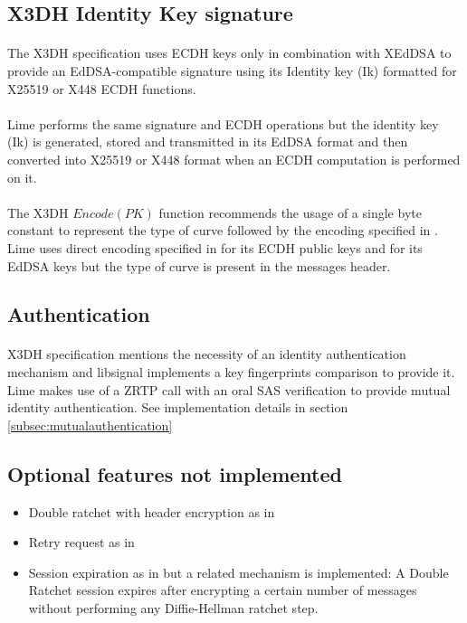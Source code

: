 \documentclass[a4paper,11pt]{article}
\begin{document}
  \subsection{X3DH Identity Key signature}
    \label{subsec:x3dhIk}
    \paragraph{}The X3DH specification uses ECDH keys only in combination with XEdDSA\cite{xeddsa} to provide an EdDSA-compatible signature using its Identity key (Ik) formatted for X25519 or X448 ECDH functions.
    \paragraph{}Lime performs the same signature and ECDH operations but the identity key (Ik) is generated, stored and transmitted in its EdDSA format and then converted into X25519 or X448 format when an ECDH computation is performed on it.
    \paragraph{}The X3DH $Encode(PK)$ function recommends the usage of a single byte constant to represent the type of curve followed by the encoding specified in \cite{rfc7748}. Lime uses direct encoding specified in \cite{rfc7748} for its ECDH public keys and \cite{rfc8032} for its EdDSA keys but the type of curve is present in the messages header.

  \subsection{Authentication}
  \paragraph*{}X3DH specification mentions \cite[section 4.1]{x3dh} the necessity of an identity authentication mechanism and libsignal\cite{libsignal} implements a key fingerprints comparison to provide it. Lime makes use of a ZRTP\cite{zrtp} call with an oral SAS verification to provide mutual identity authentication. See implementation details in section \ref{subsec:mutualauthentication}
  \subsection{Optional features not implemented}
    \begin{itemize}
      \item Double ratchet with header encryption as in \cite[section 4]{doubleRatchet}
      \item Retry request as in \cite[section 4.1]{sesame}
      \item Session expiration as in \cite[section 4.2]{sesame} but a related mechanism is implemented: A Double Ratchet session expires after encrypting a certain number of messages without performing any Diffie-Hellman ratchet step.
    \end{itemize}
\end{document}
